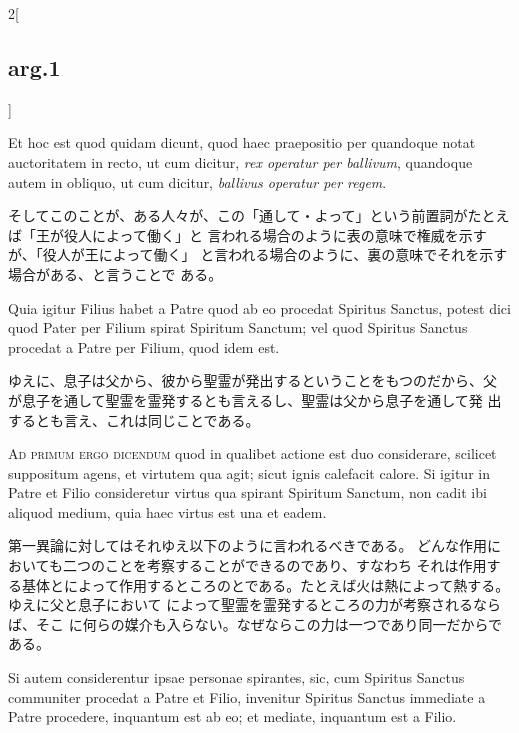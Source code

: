 \documentclass[paper=a4paper,fontsize=10pt,jafontsize=9pt,titlepage]{jlreq}
\begin{document}
\begin{paracol}{2}[\subsection{arg.1}]
\switchcolumn*

Et hoc est
quod quidam dicunt, quod haec praepositio per quandoque notat
auctoritatem in recto, ut cum dicitur, {\itshape rex operatur per ballivum},
quandoque autem in obliquo, ut cum dicitur, {\itshape ballivus operatur per
regem}.

\switchcolumn

そしてこのことが、ある人々が、この「通して・よって」という前置詞がたとえば「王が役人によって働く」と
 言われる場合のように表の意味で権威を示すが、「役人が王によって働く」
 と言われる場合のように、裏の意味でそれを示す場合がある、と言うことで
 ある。

\switchcolumn*

Quia igitur Filius habet a Patre quod ab eo procedat 
Spiritus Sanctus, potest dici quod Pater per Filium spirat  Spiritum
Sanctum; vel quod Spiritus Sanctus procedat a Patre per
Filium, quod idem est.

\switchcolumn

ゆえに、息子は父から、彼から聖霊が発出するということをもつのだから、父
 が息子を通して聖霊を霊発するとも言えるし、聖霊は父から息子を通して発
 出するとも言え、これは同じことである。

\switchcolumn*[\subsection{ad.1}]

{\scshape Ad primum ergo dicendum} quod in qualibet actione est duo considerare,
scilicet suppositum agens, et virtutem qua agit; sicut ignis calefacit
calore. Si igitur in Patre et Filio consideretur virtus qua spirant
Spiritum Sanctum, non cadit ibi aliquod medium, quia haec virtus est
una et eadem.

\switchcolumn

第一異論に対してはそれゆえ以下のように言われるべきである。
どんな作用においても二つのことを考察することができるのであり、すなわち
 それは作用する基体とによって作用するところのとである。たとえば火は熱によって熱する。ゆえに父と息子において
 によって聖霊を霊発するところの力が考察されるならば、そこ
 に何らの媒介も入らない。なぜならこの力は一つであり同一だからである。

\switchcolumn*

Si autem considerentur ipsae personae spirantes, sic,
cum  Spiritus Sanctus communiter procedat a Patre et Filio,
invenitur Spiritus Sanctus immediate a Patre procedere,
inquantum est ab eo; et mediate, inquantum est a Filio.


\end{paracol}
\end{document}
